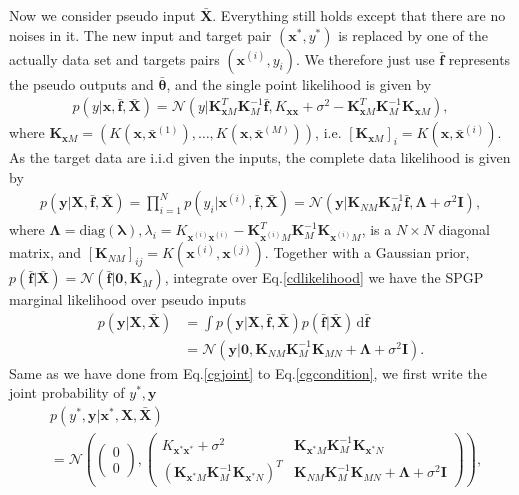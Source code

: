 \documentclass[10pt,a4paper]{article}
\begin{document}
Now we consider pseudo input $\bar{\pmb{X}}$. Everything still holds except that there are no noises in it. The new input and target pair $(\pmb{x}^*,y^*)$ is replaced by one of the actually data set and targets pairs $(\pmb{x}^{(i)},y_i)$. We therefore just use $\bar{\pmb{f}}$ represents the pseudo outputs and $\bar{\pmb{\theta}}$, and the single point likelihood is given by
\begin{align}
p(y|\pmb{x},\bar{\pmb{f}},\bar{\pmb{X}})=\mathcal{N}(y|\pmb{K}_{\pmb{x}M}^T\pmb{K}_M^{-1}\bar{\pmb{f}},K_{\pmb{x}\pmb{x}}+\sigma^2-\pmb{K}_{\pmb{x}M}^T\pmb{K}_M^{-1}\pmb{K}_{\pmb{x}M}),
\end{align}
where $\pmb{K}_{\pmb{x}M}=(K(\pmb{x},\bar{\pmb{x}}^{(1)}),\dots,K(\pmb{x},\bar{\pmb{x}}^{(M)}))$, i.e. $[\pmb{K}_{\pmb{x}M}]_{i}=K(\pmb{x},\bar{\pmb{x}}^{(i)})$.
As the target data are i.i.d given the inputs, the complete data likelihood is given by
\begin{align}
p(\pmb{y}|\pmb{X},\bar{\pmb{f}},\bar{\pmb{X}})=\prod^N_{i=1}p(y_i|\pmb{x}^{(i)},\bar{\pmb{f}},\bar{\pmb{X}})=\mathcal{N}(\pmb{y}|\pmb{K}_{NM}\pmb{K}_M^{-1}\bar{\pmb{f}}, \pmb{\Lambda}+\sigma^2\pmb{I}),
\label{cdlikelihood}
\end{align}
where $\pmb{\Lambda}=\text{diag}(\pmb{\lambda}),\lambda_i = K_{\pmb{x}^{(i)}\pmb{x}^{(i)}}-\pmb{K}_{\pmb{x}^{(i)}M}^T\pmb{K}_M^{-1}\pmb{K}_{\pmb{x}^{(i)}M}$, is a $N\times N$ diagonal matrix, and $[\pmb{K}_{NM}]_{ij}=K(\pmb{x}^{(i)},\pmb{x}^{(j)})$.
Together with a Gaussian prior, $p(\bar{\pmb{f}}|\bar{\pmb{X}})=\mathcal{N}(\bar{\pmb{f}}|\pmb{0},\pmb{K}_M)$, integrate over Eq.\ref{cdlikelihood} we have the SPGP marginal likelihood over pseudo inputs
\begin{align}
p(\pmb{y}|\pmb{X},\bar{\pmb{X}})&=\int p(\pmb{y}|\pmb{X},\bar{\pmb{f}},\bar{\pmb{X}})p(\bar{\pmb{f}}|\bar{\pmb{X}})\,\mathrm{d}\bar{\pmb{f}}\nonumber\\
&=\mathcal{N}(\pmb{y}|\pmb{0},\pmb{K}_{NM}\pmb{K}_M^{-1}\pmb{K}_{MN}+\pmb{\Lambda}+\sigma^2\pmb{I}).
\end{align}
Same as we have done from Eq.\ref{cgjoint} to Eq.\ref{cgcondition}, we first write the joint probability of $y^*,\pmb{y}$
\begin{align}
&p(y^*,\pmb{y}|\pmb{x}^*,\pmb{X},\bar{\pmb{X}})\\\nonumber
&=\mathcal{N}\left(\begin{pmatrix}
0\\0
\end{pmatrix},\begin{pmatrix}
 K_{\pmb{x}^*\pmb{x}^*}+\sigma^2 & \pmb{K}_{\pmb{x}^*M}\pmb{K}_M^{-1}\pmb{K}_{\pmb{x}^*N}\\
(\pmb{K}_{\pmb{x}^*M}\pmb{K}_M^{-1}\pmb{K}_{\pmb{x}^*N})^T & \pmb{K}_{NM}\pmb{K}_M^{-1}\pmb{K}_{MN}+\pmb{\Lambda}+\sigma^2\pmb{I}
\end{pmatrix}\right),
\end{align}
\end{document}
